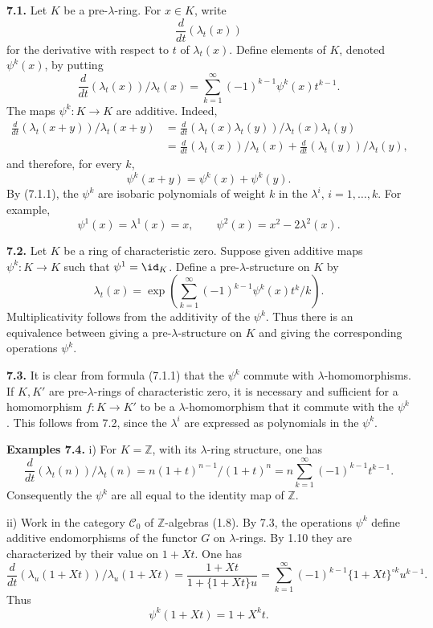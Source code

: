 \documentclass[11pt]{article}
\begin{document}
\textbf{7.1.} Let \(K\) be a pre-\(\lambda\)-ring. For \(x\in K\), write
\[
  \frac{d}{dt}(\lambda_t(x))
\]
for the derivative with respect to \(t\) of \(\lambda_t(x)\). Define elements of \(K\), denoted \(\psi^k(x)\), by putting
\begin{equation}\tag{7.1.1}
  \frac{d}{dt}(\lambda_t(x))/\lambda_t(x)
  =
  \sum_{k=1}^{\infty}(-1)^{k-1}\psi^k(x)t^{k-1}.
\end{equation}
The maps \(\psi^k:K\to K\) are additive. Indeed,
\[
\begin{aligned}
 \frac{d}{dt}(\lambda_t(x+y))/\lambda_t(x+y)
 &=
 \frac{d}{dt}(\lambda_t(x)\lambda_t(y))/\lambda_t(x)\lambda_t(y)\\
 &=
 \frac{d}{dt}(\lambda_t(x))/\lambda_t(x)
 +\frac{d}{dt}(\lambda_t(y))/\lambda_t(y),
\end{aligned}
\]
and therefore, for every \(k\),
\[
  \psi^k(x+y)=\psi^k(x)+\psi^k(y).
\]
By (7.1.1), the \(\psi^k\) are isobaric polynomials of weight \(k\) in the \(\lambda^i\), \(i=1,\ldots,k\). For example,
\[
  \psi^1(x)=\lambda^1(x)=x,
  \qquad
  \psi^2(x)=x^2-2\lambda^2(x).
\]

\textbf{7.2.} Let \(K\) be a ring of characteristic zero. Suppose given additive maps \(\psi^k:K\to K\) such that \(\psi^1=\id_K\). Define a pre-\(\lambda\)-structure on \(K\) by
\begin{equation}\tag{7.2.1}
  \lambda_t(x)=
  \exp\left(\sum_{k=1}^{\infty}(-1)^{k-1}\psi^k(x)t^k/k\right).
\end{equation}
Multiplicativity follows from the additivity of the \(\psi^k\). Thus there is an equivalence between giving a pre-\(\lambda\)-structure on \(K\) and giving the corresponding operations \(\psi^k\).

\textbf{7.3.} It is clear from formula (7.1.1) that the \(\psi^k\) commute with \(\lambda\)-homomorphisms. If \(K,K'\) are pre-\(\lambda\)-rings of characteristic zero, it is necessary and sufficient for a homomorphism \(f:K\to K'\) to be a \(\lambda\)-homomorphism that it commute with the \(\psi^k\). This follows from 7.2, since the \(\lambda^i\) are expressed as polynomials in the \(\psi^k\).

\textbf{Examples 7.4.} i) For \(K=\mathbb Z\), with its \(\lambda\)-ring structure, one has
\[
  \frac{d}{dt}(\lambda_t(n))/\lambda_t(n)
  =
  n(1+t)^{n-1}/(1+t)^n
  =
  n\sum_{k=1}^{\infty}(-1)^{k-1}t^{k-1}.
\]
Consequently the \(\psi^k\) are all equal to the identity map of \(\mathbb Z\).

ii) Work in the category \(\mathscr C_0\) of \(\mathbb Z\)-algebras (1.8). By 7.3, the operations \(\psi^k\) define additive endomorphisms of the functor \(G\) on \(\lambda\)-rings. By 1.10 they are characterized by their value on \(1+Xt\). One has
\[
  \frac{d}{dt}(\lambda_u(1+Xt))/\lambda_u(1+Xt)
  =
  \frac{1+Xt}{1+\{1+Xt\}u}
  =
  \sum_{k=1}^{\infty}(-1)^{k-1}\{1+Xt\}^{\circ k}u^{k-1}.
\]
Thus
\begin{equation}\tag{7.4.1}
  \psi^k(1+Xt)=1+X^k t.
\end{equation}
\end{document}
